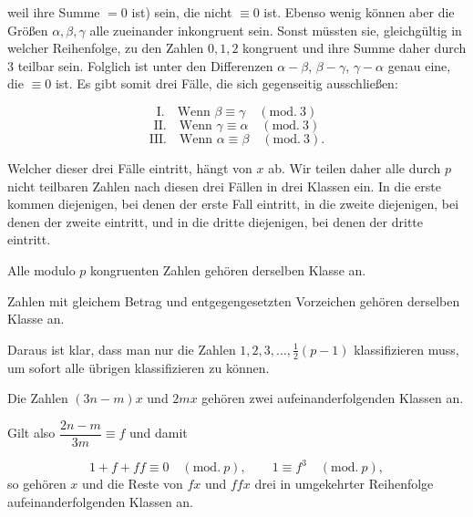weil ihre Summe $=0$ ist) sein, die nicht $\equiv 0$ ist. Ebenso wenig
können aber die Größen $\alpha, \beta, \gamma$ alle zueinander inkongruent sein.
Sonst müssten sie, gleichgültig in welcher Reihenfolge, zu den Zahlen
$0, 1, 2$ kongruent und ihre Summe daher durch $3$ teilbar sein. Folglich
ist unter den Differenzen $\alpha-\beta$,
$\beta-\gamma$, $\gamma-\alpha$ genau eine, die
$\equiv 0$ ist. Es gibt somit drei Fälle, die sich gegenseitig ausschließen:

\[
\text{I.} \quad \text{Wenn } \beta \equiv \gamma \quad(\mathrm{mod.}\ 3)
\]
\[
\text{II.} \quad \text{Wenn } \gamma \equiv \alpha \quad(\mathrm{mod.}\ 3)
\]
\[
\text{III.} \quad \text{Wenn } \alpha \equiv \beta \quad(\mathrm{mod.}\ 3).
\]

Welcher dieser drei Fälle eintritt, hängt von $x$ ab. Wir teilen daher
alle durch $p$ nicht teilbaren Zahlen nach diesen drei Fällen in drei
Klassen ein. In die erste kommen diejenigen, bei denen der erste Fall eintritt,
in die zweite diejenigen, bei denen der zweite eintritt, und in die dritte
diejenigen, bei denen der dritte eintritt.

 Alle modulo $p$ kongruenten Zahlen gehören
derselben Klasse an.

 Zahlen mit gleichem Betrag und entgegengesetzten
Vorzeichen gehören derselben Klasse an.

Daraus ist klar, dass man nur die Zahlen $1, 2, 3, \ldots,
\frac{1}{2}(p-1)$
klassifizieren muss, um sofort alle übrigen klassifizieren zu können.

 Die Zahlen $(3n-m)x$ und $2mx$ gehören zwei
aufeinanderfolgenden Klassen an.

 Gilt also $\dfrac{2n-m}{3m} \equiv f$ und damit

\[
1+f+ff \equiv 0 \quad(\mathrm{mod.}\ p), \qquad 1 \equiv f^3 \quad(\mathrm{mod.}\ p),
\]
\noindent so gehören $x$ und die Reste von $fx$ und $ffx$
drei in umgekehrter Reihenfolge aufeinanderfolgenden Klassen an.

